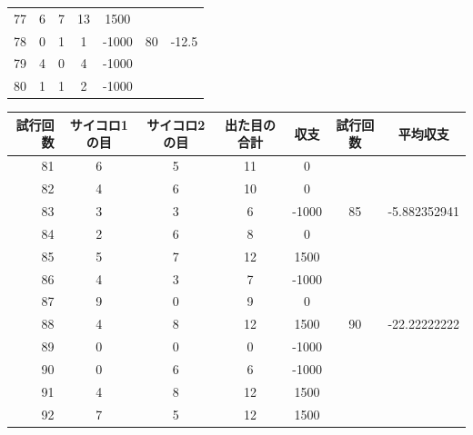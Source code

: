 \documentclass[12pt]{jarticle}
\begin{document}
\begin{table}
\begin{tabular}[h]{|r|c|c|c|c|c|c|}
        77        & 6             & 7             & 13           & 1500  &          &             \\
        78        & 0             & 1             & 1            & -1000 & 80       & -12.5       \\
        79        & 4             & 0             & 4            & -1000 &          &             \\
        80        & 1             & 1             & 2            & -1000 &          &             \\
        \hline
    \end{tabular}
\end{table}
\clearpage
\begin{table}
    \begin{tabular}[h]{|r|c|c|c|c|c|c|}
        \hline
        試行回数 & サイコロ1の目 & サイコロ2の目 & 出た目の合計 & 収支  & 試行回数 & 平均収支     \\
        \hline
        81       & 6             & 5             & 11           & 0     &          &              \\
        82       & 4             & 6             & 10           & 0     &          &              \\
        83       & 3             & 3             & 6            & -1000 & 85       & -5.882352941 \\
        84       & 2             & 6             & 8            & 0     &          &              \\
        85       & 5             & 7             & 12           & 1500  &          &              \\
        \hline
        86       & 4             & 3             & 7            & -1000 &          &              \\
        87       & 9             & 0             & 9            & 0     &          &              \\
        88       & 4             & 8             & 12           & 1500  & 90       & -22.22222222 \\
        89       & 0             & 0             & 0            & -1000 &          &              \\
        90       & 0             & 6             & 6            & -1000 &          &              \\
        \hline
        91       & 4             & 8             & 12           & 1500  &          &              \\
        92       & 7             & 5             & 12           & 1500  &          &              \\

\end{tabular}
\end{table}
\end{document}
